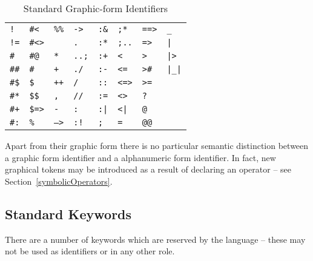 \begin{table}[h]
\begin{center}
\caption{Standard Graphic-form Identifiers}\label{standardGraphicsTable}
\begin{tabular}{|llllllll|}
\hline
\tt !&\tt \#<&\tt \%\%&\tt ->&\tt :\&&\tt ;*&\tt ==>&\tt \_\\
\tt !=&\tt \#<>&\tt *&\tt .&\tt :*&\tt ;..&\tt =>&\tt |\\
\tt \#&\tt \#@&\tt **&\tt ..;&\tt :+&\tt <&\tt >&\tt |>\\
\tt \#\#&\tt \#\tlda{}&\tt +&\tt ./&\tt :-&\tt <=&\tt >\#&\tt |\_|\\
\tt \#\$&\tt \$&\tt ++&\tt /&\tt ::&\tt <=>&\tt >=&\tt \tlda{}\\
\tt \#*&\tt \$\$&\tt ,&\tt //&\tt :=&\tt <>&\tt ?&\\
\tt \#+&\tt \$=>&\tt -&\tt :&\tt :|&\tt <|&\tt @&\\
\tt \#:&\tt \%&\tt -->&\tt :!&\tt ;&\tt =&\tt @@&\\
\hline
\end{tabular}
\end{center}
\end{table}
\begin{aside}
Apart from their graphic form there is no particular semantic distinction between a graphic form identifier and a alphanumeric form identifier. In fact, new graphical tokens may be introduced as a result of declaring an operator -- see Section~\vref{symbolicOperators}.
\end{aside}

\subsection{Standard Keywords}
\label{keywords}
There are a number of keywords which are reserved by the language -- these may not be used as identifiers or in any other role.

